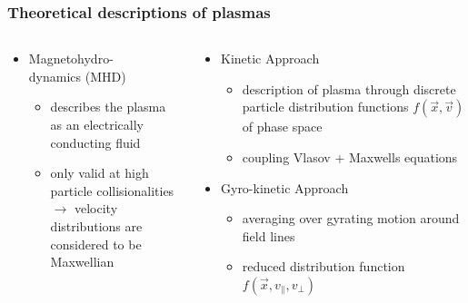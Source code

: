 \documentclass{beamer}
\begin{document}
\begin{frame}
\frametitle{Theoretical descriptions of plasmas}
\vspace{-1.5 cm}
\begin{columns}[onlytextwidth]
	\begin{column}{0.5\textwidth}
		\begin{center}
			\begin{itemize}
			\item Magnetohydro-\\
			dynamics (MHD)
			\begin{itemize}
				\item describes the plasma as an electrically conducting fluid
				\item only valid at high particle collisionalities \\
				$\rightarrow$ velocity distributions are considered to be Maxwellian
			\end{itemize}
			\end{itemize}
		\end{center}
	\end{column}
	\begin{column}{0.5\textwidth}
		\begin{center}
			\begin{itemize}
			\item Kinetic Approach
				\begin{itemize}
						\item description of plasma through discrete particle distribution functions $f(\vec{x},\vec{v})$ of phase space
						\item coupling Vlasov + Maxwells equations
				\end{itemize}
			\item Gyro-kinetic Approach
				\begin{itemize}
				\item averaging over gyrating motion around field lines
				\item reduced distribution function $f(\vec{x},v_\parallel, v_\perp)$
			\end{itemize}
			\end{itemize}
		\end{center}
	\end{column}
\end{columns}
 \end{frame}
\end{document}
